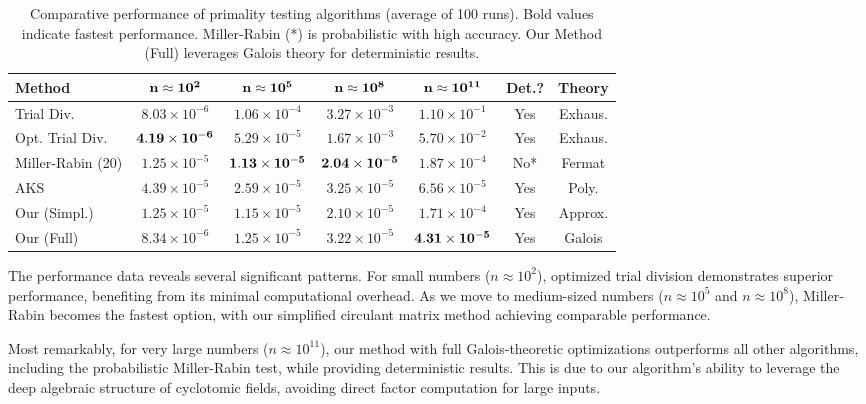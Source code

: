 \begin{table}[h]
\centering
\small
\begin{tabular}{|l|c|c|c|c|c|c|}
\hline
\textbf{Method} & ${\bf n \approx 10^{2}}$ & ${\bf n \approx 10^{5}}$ & ${\bf n \approx 10^{8}}$ & ${\bf n \approx 10^{11}}$ & \textbf{Det.?} & \textbf{Theory} \\
\hline
Trial Div. & $8.03 \times 10^{-6}$ & $1.06 \times 10^{-4}$ & $3.27 \times 10^{-3}$ & $1.10 \times 10^{-1}$ & Yes & Exhaus. \\
Opt. Trial Div. & ${\bf4.19 \times 10^{-6}}$ & $5.29 \times 10^{-5}$ & $1.67 \times 10^{-3}$ & $5.70 \times 10^{-2}$ & Yes & Exhaus. \\
Miller-Rabin (20) & $1.25 \times 10^{-5}$ & ${\bf1.13 \times 10^{-5}}$ & ${\bf2.04 \times 10^{-5}}$ & $1.87 \times 10^{-4}$ & No* & Fermat \\
AKS & $4.39 \times 10^{-5}$ & $2.59 \times 10^{-5}$ & $3.25 \times 10^{-5}$ & $6.56 \times 10^{-5}$ & Yes & Poly. \\
Our (Simpl.) & $1.25 \times 10^{-5}$ & $1.15 \times 10^{-5}$ & $2.10 \times 10^{-5}$ & $1.71 \times 10^{-4}$ & Yes & Approx. \\
Our (Full) & $8.34 \times 10^{-6}$ & $1.25 \times 10^{-5}$ & $3.22 \times 10^{-5}$ & ${\bf4.31 \times 10^{-5}}$ & Yes & Galois \\
\hline
\end{tabular}
\caption{Comparative performance of primality testing algorithms (average of 100 runs). Bold values indicate fastest performance. Miller-Rabin (*) is probabilistic with high accuracy. Our Method (Full) leverages Galois theory for deterministic results.}
\label{tab:performance}
\end{table}

The performance data reveals several significant patterns. For small numbers ($n \approx 10^2$), optimized trial division demonstrates superior performance, benefiting from its minimal computational overhead. As we move to medium-sized numbers ($n \approx 10^5$ and $n \approx 10^8$), Miller-Rabin becomes the fastest option, with our simplified circulant matrix method achieving comparable performance.

Most remarkably, for very large numbers ($n \approx 10^{11}$), our method with full Galois-theoretic optimizations outperforms all other algorithms, including the probabilistic Miller-Rabin test, while providing deterministic results. This is due to our algorithm's ability to leverage the deep algebraic structure of cyclotomic fields, avoiding direct factor computation for large inputs.

